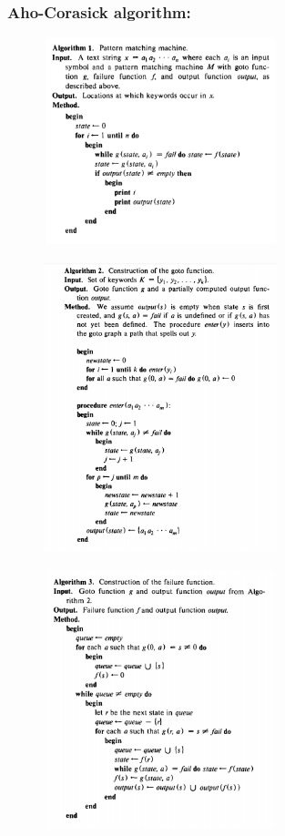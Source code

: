 \documentclass[a4paper,11pt,twocolumn]{article}
\begin{document}
\subsubsection{Aho-Corasick algorithm:}

\begin{figure}[H]
\includegraphics[width=6.8cm,height=6cm]{algo1}
\end{figure} 

\begin{figure}[H]
\includegraphics[width=6.8cm,height=8.5cm]{algo2}
\end{figure} 

\begin{figure}[H]
\includegraphics[width=6.8cm,height=7.5cm]{algo3}
\end{figure} 
\end{document}

